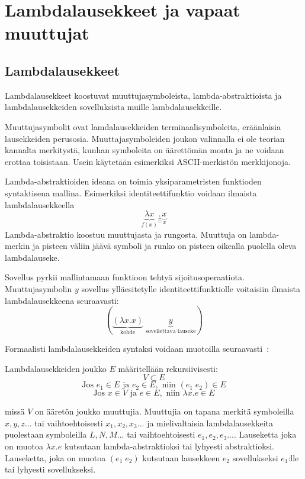 \section{Lambdalausekkeet ja vapaat muuttujat}

\subsection{Lambdalausekkeet}

Lambdalausekkeet koostuvat muuttujasymboleista, lambda-abstraktioista ja lambdalausekkeiden sovelluksista muille lambdalausekkeille.
\par 
Muuttujasymbolit ovat lamdalausekkeiden terminaalisymboleita, eräänlaisia lausekkeiden perusosia. Muuttajasymboleiden joukon valinnalla ei ole teorian kannalta merkitystä, kunhan symboleita on äärettömän monta ja ne voidaan erottaa toisistaan. Usein käytetään esimerkiksi ASCII-merkistön merkkijonoja.
\par
Lambda-abstraktioiden ideana on toimia yksiparametristen funktioden syntaktisena mallina. Esimerkiksi identiteettifunktio voidaan ilmaista lambdalausekkeella 
\[ \underbrace{ \lambda x }_{ f(x) } \underbrace{ . }_{ = }  \underbrace{ x }_{x} \]
Lambda-abstraktio koostuu muuttujasta ja rungosta. Muuttuja on lambda-merkin ja pisteen väliin jäävä symboli ja runko on pisteen oikealla puolella oleva lambdalauseke. 
\par
Sovellus pyrkii mallintamaan funktioon tehtyä sijoitusoperaatiota. Muuttujasymbolin $y$ sovellus ylläesitetylle identiteettifunktiolle voitaisiin ilmaista lambdalausekkeena seuraavasti:
\[ ( \underbrace{ (\lambda x . x ) }_{ \text{kohde} } \; \underbrace{ y }_{ \text{sovellettava lauseke} } ) \]
\par
Formaalisti lambdalausekkeiden syntaksi voidaan muotoilla seuraavasti~\cite[s.~8]{Hudak89}:
\pagebreak
\begin{maar}[lambdalausekkeet]
Lambdalausekkeiden joukko $E$ määritellään rekursiivisesti: 
\[ V \subset E \]
\[ \text{Jos } e_{1} \in E \text{ ja } e_{2} \in E, \text{ niin }  (e_{1} \; e_{2}) \in E \]
\[ \text{Jos } x \in V \text{ ja } e \in E, \text{ niin } \lambda x.e \in E \]

missä $V$ on ääretön joukko muuttujia. Muuttujia on tapana merkitä symboleilla $x, y,z...$ tai vaihtoehtoisesti $x_{1}, x_{2}, x_{3}...$ ja mielivaltaisia lambdalausekkeita puolestaan symboleilla $L, N, M ...$ tai vaihtoehtoisesti $e_{1}, e_{2}, e_{3}...$.  Lauseketta joka on muotoa $\lambda x.e$ kutsutaan lambda-abstraktioksi tai lyhyesti abstraktioksi. Lauseketta, joka on muotoa $(e_{1} \; e_{2})$ kutsutaan lausekkeen $e_{2}$ sovellukseksi $e_{1}$:lle tai lyhyesti sovellukseksi.
\end{maar}

